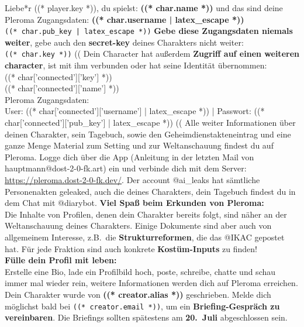Liebe*r ((* player.key *)),\absatz
%
du spielst: \textbf{((* char.name *))} und das sind deine Pleroma
Zugangsdaten:\absatz
%
\textbf{((* char.username | latex_escape *))}\\
\texttt{((* char.pub_key  | latex_escape *))}\absatz
% 
\textbf{Gebe diese Zugangsdaten niemals weiter}, gebe auch den
\textbf{secret-key} deines Charakters nicht weiter:\\
%
\texttt{((* char.key *))}\absatz
((%
  Dein Character hat außerdem \textbf{Zugriff auf einen weiteren character}, ist mit ihm
  verbunden oder hat seine Identität übernommen:\\
  ((* char['connected']['key'] *))\\
  ((* char['connected']['name'] *))\\
  Pleroma Zugangsdaten:\\
  User: ((* char['connected']['username'] | latex_escape *))
  | Passwort: ((* char['connected']['pub_key']  | latex_escape *))
((%
\absatz
% 
%
Alle weiter Informationen über deinen Charakter, sein Tagebuch, sowie den
Geheimdienstakteneintrag und eine ganze Menge Material zum Setting und zur
Weltanschauung findest du auf Pleroma. Logge dich über die App (Anleitung in der
letzten Mail von hauptmann@dost-2-0-fk.art) ein und
verbinde dich mit dem Server: \url{https://pleroma.dost-2-0-fk.dev/}.
Der account @ai\_leaks hat sämtliche Personenakten geleaked, auch die deines
Charakters, dein Tagebuch findest du in dem Chat mit @diarybot.\absatz
%
\textbf{Viel Spaß beim Erkunden von Pleroma:}\\
Die Inhalte von Profilen, denen dein Charakter bereits folgt, sind näher an der
Weltanschauung deines Charakters. Einige Dokumente sind aber auch von
allgemeinem Interesse, z.B.~die \textbf{Strukturreformen}, die das @IKAC
gepostet hat. Für jede Fraktion sind auch konkrete \textbf{Kostüm-Inputs} zu
finden!\\
% 
\textbf{Fülle dein Profil mit leben:}\\
Erstelle eine Bio, lade ein Profilbild hoch, poste, schreibe, chatte und schau
immer mal wieder rein, weitere Informationen werden dich auf Pleroma
erreichen.\absatz
%  
Dein Charakter wurde von \textbf{((* creator.alias *))} geschrieben. Melde dich
möglichst bald bei \texttt{((* creator.email *))}, um ein
\textbf{Briefing-Gespräch zu vereinbaren}. Die Briefings sollten spätestens am
\textbf{20.~Juli} abgeschlossen sein.
